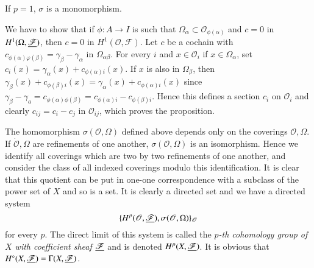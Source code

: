 \begin{proposition}\label{chap13:prop2}
If $p =1$, $\sigma$ is a monomorphism.

We have to show that if $\phi: A \to I$ is such that $\Omega_\alpha
\subset \mathscr{O}_{\phi (\alpha)}$ and $c=0$ in $H^1 (\Omega,
  \underline{\mathscr{F}})$, then $c =0$ in $H^1 (\mathscr{O},
  \mathscr{F})$. Let $c$ be a cochain with $c_{\phi(\alpha)\varphi(\beta)}
  = \gamma_\beta - \gamma_\alpha$ in $\Omega_{\alpha \beta}$. For
  every $i$ and $x \in \mathscr{O}_i$ if $x \in\Omega_\alpha$, set
  $c_i(x) = \gamma_\alpha(x) + c_{\phi(\alpha)i} (x)$. If $x$ is also
  in $\Omega_\beta$, then $\gamma_\beta(x) + c_{\phi(\beta)i} (x) =
  \gamma_\alpha (x) + c_{\phi(\alpha)i}(x)$ since $\gamma_\beta -
  \gamma_a = c_{\phi(\alpha) \phi (\beta)} = c_{\phi(\alpha) i} -
  c_{\phi(\beta)i}$. Hence this defines a section $c_i$ on
  $\mathscr{O}_i$ and clearly $c_{ij} = c_i - c_j$ in
  $\mathscr{O}_{ij}$, which proves the proposition.

The homomorphism $\sigma (\mathscr{O}, \Omega)$ defined above depends
only on the coverings $\mathscr{O}, \Omega$. If $\dot{\mathscr{O}}, \Omega$
are refinements of one another, $\sigma (\mathscr{O}, \Omega)$ is an
isomorphism. Hence we identify all coverings which are two by two
refinements of one another, and consider the class of all indexed
coverings modulo this identification. It is clear that this quotient
can be put in one-one correspondence with a subclass of the power set
of $X$ and so is a set. It is clearly a directed set and we have a
directed system 
$$
\{H^p (\mathscr{O}, \underline{\mathscr{F}}), \sigma (\mathscr{O},
\Omega)\}_{\mathscr{O}} 
$$\pageoriginale
for every $p$. The direct limit of this system is called the
\textit{$p$-th cohomology group of $X$ with coefficient sheaf
  $\underline{\mathscr{F}}$} and is denoted $H^p (X, \underline{\mathscr{F}})$. It is
obvious that $H^\circ (X, \underline{\mathscr{F}}) = \Gamma(X,
\underline{\mathscr{F}})$. 
\end{proposition}



